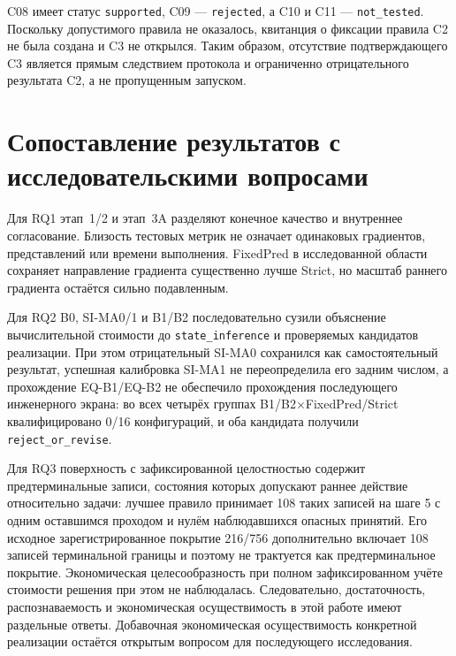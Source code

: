 C08 имеет статус \texttt{supported}, C09 --- \texttt{rejected}, а C10 и C11
--- \texttt{not\_tested}.
Поскольку допустимого правила не оказалось, квитанция о фиксации правила C2 не
была создана и C3 не открылся. Таким образом, отсутствие подтверждающего C3
является прямым следствием протокола и ограниченно отрицательного результата C2,
а не пропущенным запуском.

\section{Сопоставление результатов с исследовательскими вопросами}
\label{sec:results-rq-reconciliation}

Для RQ1 этап~1/2 и этап~3A разделяют конечное качество и внутреннее
согласование. Близость тестовых метрик не означает одинаковых градиентов,
представлений или времени выполнения. FixedPred в исследованной области
сохраняет направление градиента существенно лучше Strict, но масштаб раннего
градиента остаётся сильно подавленным.

Для RQ2 B0, SI-MA0/1 и B1/B2 последовательно сузили объяснение вычислительной
стоимости до \texttt{state\_inference} и проверяемых кандидатов реализации. При
этом отрицательный SI-MA0 сохранился как самостоятельный результат, успешная
калибровка SI-MA1 не переопределила его задним числом, а прохождение EQ-B1/EQ-B2
не обеспечило прохождения последующего инженерного экрана: во всех четырёх
группах B1/B2×FixedPred/Strict квалифицировано 0/16 конфигураций, и оба кандидата
получили \texttt{reject\_or\_revise}.

Для RQ3 поверхность с зафиксированной целостностью содержит предтерминальные
записи, состояния которых допускают раннее действие относительно задачи: лучшее
правило принимает 108 таких записей на шаге 5 с одним оставшимся проходом и
нулём наблюдавшихся опасных принятий. Его исходное зарегистрированное покрытие 216/756 дополнительно
включает 108 записей терминальной границы и поэтому не трактуется как
предтерминальное покрытие. Экономическая целесообразность при полном
зафиксированном учёте стоимости решения при этом не наблюдалась. Следовательно,
достаточность, распознаваемость и экономическая осуществимость в этой работе
имеют раздельные
ответы. Добавочная экономическая осуществимость конкретной реализации остаётся
открытым вопросом для последующего исследования.
